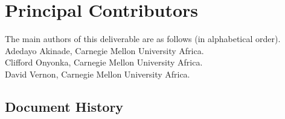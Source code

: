 \documentclass{CSSRforAfrica}
\begin{document}
%  
 

%                                 



\pagebreak
\section*{Principal Contributors}
\label{contributors}
The main authors of this deliverable are as follows (in alphabetical order).\\
Adedayo Akinade, Carnegie Mellon University Africa.\\
Clifford Onyonka, Carnegie Mellon University Africa.\\
David Vernon, Carnegie Mellon University Africa.\\     

  

\newpage
\subsection*{Document History}
\label{document_history}
\end{document}
